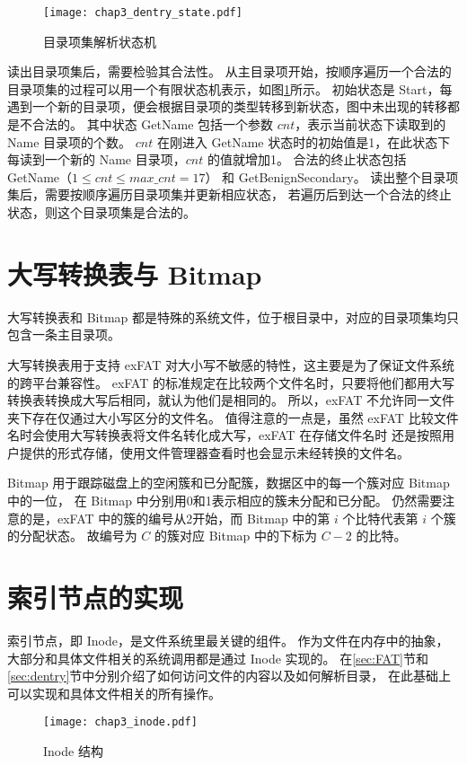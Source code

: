 \begin{figure}[h]
    \centering
    \texttt{[image: chap3\_dentry\_state.pdf]}
    \caption{目录项集解析状态机}
    \label{fig:dentry_state}
\end{figure}

读出目录项集后，需要检验其合法性。
从主目录项开始，按顺序遍历一个合法的目录项集的过程可以用一个有限状态机表示，如图\ref{fig:dentry_state}所示。
初始状态是 Start，每遇到一个新的目录项，便会根据目录项的类型转移到新状态，图中未出现的转移都是不合法的。
其中状态 GetName 包括一个参数 $ cnt $，表示当前状态下读取到的 Name 目录项的个数。
$ cnt $ 在刚进入 GetName 状态时的初始值是1，在此状态下每读到一个新的 Name 目录项，$ cnt $ 的值就增加1。
合法的终止状态包括 GetName（$ 1 \leq cnt \leq max\_cnt = 17 $） 和 GetBenignSecondary。 
读出整个目录项集后，需要按顺序遍历目录项集并更新相应状态，
若遍历后到达一个合法的终止状态，则这个目录项集是合法的。


\section{大写转换表与 Bitmap}
大写转换表和 Bitmap 都是特殊的系统文件，位于根目录中，对应的目录项集均只包含一条主目录项。

大写转换表用于支持 exFAT 对大小写不敏感的特性，这主要是为了保证文件系统的跨平台兼容性。
exFAT 的标准规定在比较两个文件名时，只要将他们都用大写转换表转换成大写后相同，就认为他们是相同的。
所以，exFAT 不允许同一文件夹下存在仅通过大小写区分的文件名。
值得注意的一点是，虽然 exFAT 比较文件名时会使用大写转换表将文件名转化成大写，exFAT 在存储文件名时
还是按照用户提供的形式存储，使用文件管理器查看时也会显示未经转换的文件名。

Bitmap 用于跟踪磁盘上的空闲簇和已分配簇，数据区中的每一个簇对应 Bitmap 中的一位，
在 Bitmap 中分别用0和1表示相应的簇未分配和已分配。
仍然需要注意的是，exFAT 中的簇的编号从2开始，而 Bitmap 中的第 $ i $ 个比特代表第 $ i $ 个簇的分配状态。
故编号为 $ C $ 的簇对应 Bitmap 中的下标为 $ C - 2 $ 的比特。

\section{索引节点的实现}
索引节点，即 Inode，是文件系统里最关键的组件。
作为文件在内存中的抽象，大部分和具体文件相关的系统调用都是通过 Inode 实现的。
在\ref{sec:FAT}节和\ref{sec:dentry}节中分别介绍了如何访问文件的内容以及如何解析目录，
在此基础上可以实现和具体文件相关的所有操作。

\begin{figure}[h]
    \centering
    \texttt{[image: chap3\_inode.pdf]}
    \caption{Inode 结构}
    \label{fig:inode}
\end{figure}

